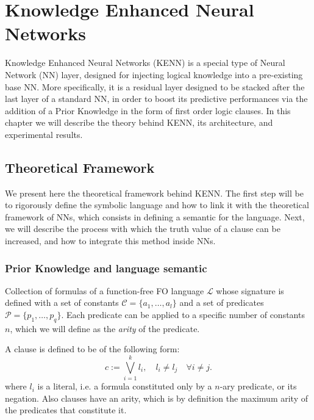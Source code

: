
\chapter{Knowledge Enhanced Neural Networks}\label{chapt:kenn}
Knowledge Enhanced Neural Networks (KENN) is a special type of Neural Network (NN) layer, designed for injecting logical knowledge into a pre-existing base NN. More specifically, it is a residual layer designed to be stacked after the last layer of a standard NN, in order to boost its predictive performances via the addition of a Prior Knowledge in the form of first order logic clauses. In this chapter we will describe the theory behind KENN, its architecture, and experimental results.

\section{Theoretical Framework}\label{sec:theoretical_framework}
 We present here the theoretical framework behind KENN. The first step will be to rigorously define the symbolic language and how to link it with the theoretical framework of NNs, which consists in defining a semantic for the language. Next, we will describe the process with which the truth value of a clause can be increased, and how to integrate this method inside NNs.
 
 \subsection{Prior Knowledge and language semantic}

\begin{definition}
	Collection of formulas of a function-free FO language $\mathcal{L}$ whose signature is defined with a set of constants $\mathcal{C} = \{a_1, \dots, a_l\}$ and a set of predicates $\mathcal{P} = \{p_1, \dots, p_q\}$. Each predicate can be applied to a specific number of constants $n$, which we will define as the \textit{arity} of the predicate.
\end{definition}

\begin{definition}[Clause]
	A clause is defined to be of the following form:
	\begin{equation}
	c := \bigvee_{i=1}^k l_i, \quad l_i \neq l_j \quad \forall i \neq j.
	\end{equation}
	where $l_i$ is a literal, i.e. a formula constituted only by a $n$-ary predicate, or its negation. Also clauses have an arity, which is by definition the maximum arity of the predicates that constitute it.
\end{definition}

